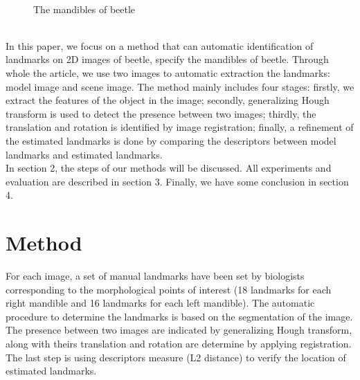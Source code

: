 \documentclass[twoside,twocolumn,10pt]{article}
\begin{document}
\begin{figure}[h]
\centering
{}~~
\caption{The mandibles of beetle}
\label{figparts}
\end{figure}~\\[0.1cm]
In this paper, we focus on a method that can automatic identification
of landmarks on 2D images of beetle, specify the mandibles of
beetle. Through whole the article, we use two images to automatic
extraction the landmarks: model image and scene image. The method
mainly includes four stages: firstly, we extract the features of the
object in the image; secondly, generalizing Hough transform is used to
detect the presence between two images; thirdly, the translation and
rotation is identified by image registration; finally, a refinement of
the estimated landmarks is done by comparing the descriptors  between
model landmarks and estimated landmarks.\\[0.1cm]

In section 2, the steps of our methods will be discussed. All
experiments and evaluation are described in section 3. Finally, we
have some conclusion in section 4.

\section{Method}
For each image, a set of manual landmarks have been set by biologists
corresponding to the morphological points of interest (18 landmarks
for each right mandible and 16 landmarks for each left mandible). The
automatic procedure to determine the landmarks is based on the
segmentation of the image. The presence between two images are
indicated by generalizing Hough transform, along with theirs
translation and rotation are determine by applying registration. The
last step is using descriptors measure (L2 distance) to verify the
location of estimated landmarks.
\end{document}

